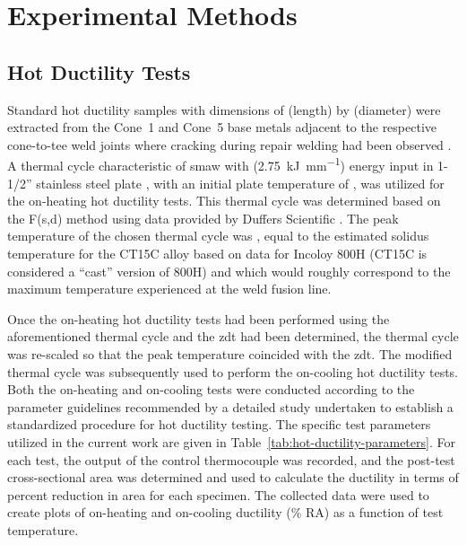 \chapter{Experimental Methods} \label{ch:experimental-methods}

\section{Hot Ductility Tests}
Standard hot ductility samples with dimensions of  (length) by  (diameter) were extracted from the Cone~1 and Cone~5 base metals adjacent to the respective cone-to-tee weld joints where cracking during repair welding had been observed \cite{hoffman_weld_1998}.  A thermal cycle characteristic of \gls{smaw} with  (\SI[round-mode=places,round-precision=2]{2.75}{\kilo\joule\per\milli\meter}) energy input in 1-1/2” stainless steel plate \cite{nippes_heat-affected_1955}, with an initial plate temperature of , was utilized for the on-heating hot ductility tests.  This thermal cycle was determined based on the F(s,d) method \cite{nippes_cooling_1949} using data provided by Duffers Scientific \cite{duffers_haz_1989}. The peak temperature of the chosen thermal cycle was , equal to the estimated solidus temperature for the CT15C alloy based on data for Incoloy 800H (CT15C is considered a ``cast'' version of 800H) and which would roughly correspond to the maximum temperature experienced at the weld fusion line.

Once the on-heating hot ductility tests had been performed using the aforementioned thermal cycle and the \gls{zdt} had been determined, the thermal cycle was re-scaled so that the peak temperature coincided with the \gls{zdt}. The modified thermal cycle was subsequently used to perform the on-cooling hot ductility tests.  Both the on-heating and on-cooling tests were conducted according to the parameter guidelines recommended by a detailed study \cite{lundin_standardization_1990_experiment} undertaken to establish a standardized procedure for hot ductility testing.  The specific test parameters utilized in the current work are given in Table~\ref{tab:hot-ductility-parameters}.  For each test, the output of the control thermocouple was recorded, and the post-test cross-sectional area was determined and used to calculate the ductility in terms of percent reduction in area for each specimen.  The collected data were used to create plots of on-heating and on-cooling ductility (\% RA) as a function of test temperature.

